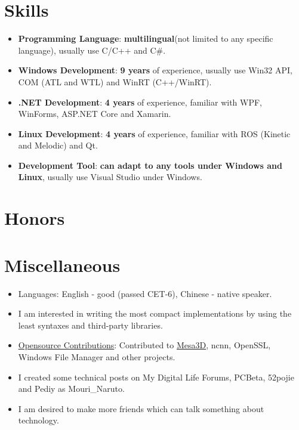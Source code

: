 \documentclass{resume}
\begin{document}
\section{Skills}
\begin{itemize}

  \item \textbf{Programming Language}:
    \textbf{multilingual}(not limited to any specific language), usually use C/C++ and C\#.

  \item \textbf{Windows Development}:
    \textbf{9 years} of experience, usually use Win32 API, COM (ATL and WTL) and WinRT (C++/WinRT).

  \item \textbf{.NET Development}:
    \textbf{4 years} of experience, familiar with WPF, WinForms, ASP.NET Core and Xamarin.
  
  \item \textbf{Linux Development}:
    \textbf{4 years} of experience, familiar with ROS (Kinetic and Melodic) and Qt.

  \item \textbf{Development Tool}:
    \textbf{can adapt to any tools under Windows and Linux}, usually use Visual Studio under Windows.

\end{itemize}

\section{Honors}


\section{Miscellaneous}
\begin{itemize}

  \item Languages: English - good (passed CET-6),  Chinese - native speaker.

  \item I am interested in writing the most compact implementations by using the least syntaxes and third-party libraries.

  \item \href{https://github.com/search?q=is%3Apr%20author%3AMouriNaruto&type=pullrequests}{Opensource Contributions}: Contributed to \href{https://gitlab.freedesktop.org/mesa/mesa/-/merge_requests/22961}{Mesa3D}, ncnn, OpenSSL, Windows File Manager and other projects.
  
  \item I created some technical posts on My Digital Life Forums, PCBeta, 52pojie and Pediy as Mouri\_Naruto.
  
  \item I am desired to make more friends which can talk something about technology.
  
\end{itemize}
\end{document}
